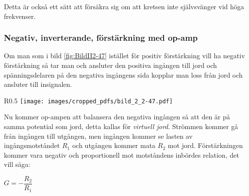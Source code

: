 Detta är också ett sätt att försäkra sig om att kretsen inte självsvänger vid
höga frekvenser.

\subsubsection{Negativ, inverterande, förstärkning med op-amp}
\label{inverterande förstärkning}
\label{virtuell jord}
\label{jordning!virtuell}

Om man som i bild \ref{fig:BildII2-47} istället för positiv förstärkning vill
ha negativ förstärkning så tar man och ansluter den positiva ingången till jord
och spänningsdelaren på den negativa ingångens sida kopplar man loss från jord
och ansluter till insignalen.

\begin{wrapfigure}{R}{0.5\textwidth}
	\texttt{[image: images/cropped\_pdfs/bild\_2\_2-47.pdf]}
	\caption{Inverterande förstärkare}
	\label{fig:BildII2-47}
\end{wrapfigure}

Nu kommer op-ampen att balansera den negativa ingången så att den är på samma
potential som jord, detta kallas för \emph{virtuell jord}.
Strömmen kommer gå från ingången till utgången, men ingången kommer se lasten
av ingångsmotståndet \(R_1\) och utgången kommer mata \(R_2\) mot jord.
Förstärkningen kommer vara negativ och proportionell mot motståndens inbördes
relation, det vill säga:

\(G = -\dfrac{R_2}{R_1}\)
